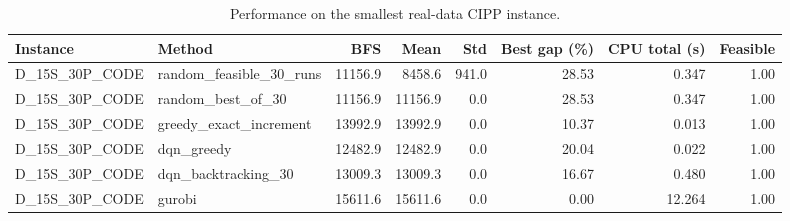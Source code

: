 \begin{table}[t]
\centering
\caption{Performance on the smallest real-data CIPP instance.}
\begin{tabular}{llrrrrrr}
\toprule
Instance & Method & BFS & Mean & Std & Best gap (\%) & CPU total (s) & Feasible \\
\midrule
D\_15S\_30P\_CODE & random\_feasible\_30\_runs & 11156.9 & 8458.6 & 941.0 & 28.53 & 0.347 & 1.00 \\
D\_15S\_30P\_CODE & random\_best\_of\_30 & 11156.9 & 11156.9 & 0.0 & 28.53 & 0.347 & 1.00 \\
D\_15S\_30P\_CODE & greedy\_exact\_increment & 13992.9 & 13992.9 & 0.0 & 10.37 & 0.013 & 1.00 \\
D\_15S\_30P\_CODE & dqn\_greedy & 12482.9 & 12482.9 & 0.0 & 20.04 & 0.022 & 1.00 \\
D\_15S\_30P\_CODE & dqn\_backtracking\_30 & 13009.3 & 13009.3 & 0.0 & 16.67 & 0.480 & 1.00 \\
D\_15S\_30P\_CODE & gurobi & 15611.6 & 15611.6 & 0.0 & 0.00 & 12.264 & 1.00 \\
\bottomrule
\end{tabular}
\end{table}
